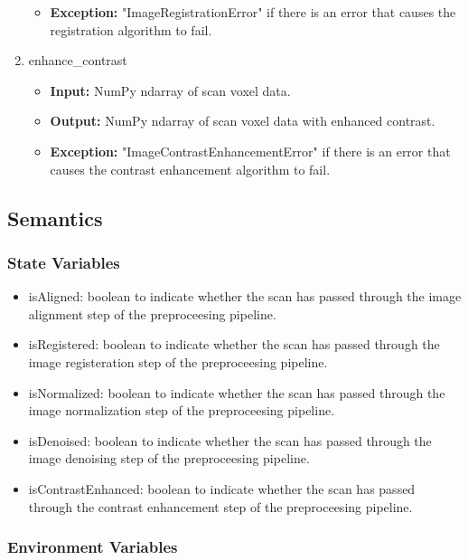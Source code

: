 \documentclass[12pt, titlepage]{article}
\begin{document}
\begin{enumerate}
\begin{itemize}
          \item \textbf{Exception:} "ImageRegistrationError" if there is an error that causes the
                registration algorithm to fail.
        \end{itemize}
  \item enhance\_contrast
        \begin{itemize}
          \item \textbf{Input:} NumPy ndarray of scan voxel data.
          \item \textbf{Output:} NumPy ndarray of scan voxel data with enhanced contrast.
          \item \textbf{Exception:} "ImageContrastEnhancementError" if there is an error that causes the
                contrast enhancement algorithm to fail.
        \end{itemize}
\end{enumerate}

\subsection{Semantics}

\subsubsection{State Variables}
\begin{itemize}
  \item isAligned: boolean to indicate whether the scan has passed
        through the image alignment step of the preproceesing pipeline.
  \item isRegistered: boolean to indicate whether the scan has passed
        through the image registeration step of the preproceesing pipeline.
  \item isNormalized: boolean to indicate whether the scan has passed
        through the image normalization step of the preproceesing pipeline.
  \item isDenoised: boolean to indicate whether the scan has passed
        through the image denoising step of the preproceesing pipeline.
  \item isContrastEnhanced: boolean to indicate whether the scan has passed
        through the contrast enhancement step of the preproceesing pipeline.
\end{itemize}

\subsubsection{Environment Variables}
\end{document}
